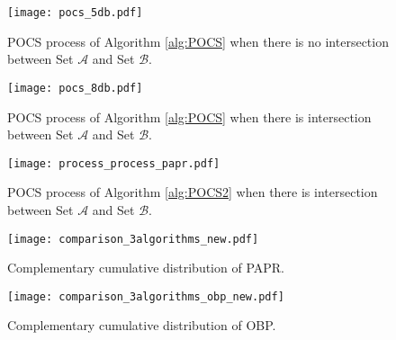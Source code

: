 \documentclass[paper]{ieice}
\begin{document}
 


\begin{figure}[t]
\begin{center}
\texttt{[image: pocs\_5db.pdf]}
\end{center}
\caption{POCS process of Algorithm \ref{alg:POCS} when there is no intersection between Set $\mathcal{A}$ and Set $\mathcal{B}$.}
\label{fig:pocs_no_interection}
\end{figure}



\begin{figure}[t]
\begin{center}
\texttt{[image: pocs\_8db.pdf]}
\end{center}
\caption{POCS process of Algorithm \ref{alg:POCS} when there is intersection between Set $\mathcal{A}$ and Set $\mathcal{B}$.}
\label{fig:pocs_interection}
\end{figure}

\begin{figure}[t]
	\begin{center}
	\texttt{[image: process\_process\_papr.pdf]}
      \end{center}
	\caption{POCS process of Algorithm \ref{alg:POCS2} when there is intersection between Set $\mathcal{A}$ and Set $\mathcal{B}$.}
	\label{fig:pocs_nointersection_papr}
\end{figure}

\begin{figure}[t]
	\begin{center}
	\texttt{[image: comparison\_3algorithms\_new.pdf]}
      \end{center}
	\caption{Complementary cumulative distribution of PAPR.}
	\label{fig:comparison_3algorithms}
\end{figure}


\begin{figure}[t]
\begin{center}
\texttt{[image: comparison\_3algorithms\_obp\_new.pdf]}
\end{center}
\caption{Complementary cumulative distribution of OBP.}
\label{fig:comparison_3algorithms_obp}
\end{figure}
\end{document}
